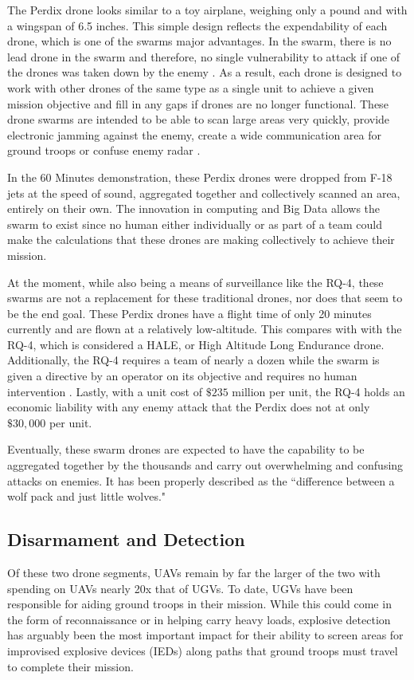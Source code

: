 \documentclass[sigconf]{acmart}
\begin{document}
The Perdix drone looks similar to a toy airplane, weighing only a pound and with a wingspan of 6.5 inches. This simple design reflects the expendability of each drone, which is one of the swarms major advantages. In the swarm, there is no lead drone in the swarm and therefore, no single vulnerability to attack if one of the drones was taken down by the enemy \cite{mitswarm}. As a result, each drone is designed to work with other drones of the same type as a single unit to achieve a given mission objective and fill in any gaps if drones are no longer functional. These drone swarms are intended to be able to scan large areas very quickly, provide electronic jamming against the enemy, create a wide communication area for ground troops or confuse enemy radar \cite{popularmechanics}.

In the 60 Minutes demonstration, these Perdix drones were dropped from F-18 jets at the speed of sound, aggregated together and collectively scanned an area, entirely on their own. The innovation in computing and Big Data allows the swarm to exist since no human either individually or as part of a  team could make the calculations that these drones are making collectively to achieve their mission.

 At the moment, while also being a means of surveillance like the RQ-4, these swarms are not a replacement for these traditional drones, nor does that seem to be the end goal. These Perdix drones have a flight time of only 20 minutes currently and are flown at a relatively low-altitude. This compares with with the RQ-4, which is considered a HALE, or High Altitude Long Endurance drone. Additionally, the RQ-4 requires a team of nearly a dozen while the swarm is given a directive by an operator on its objective and requires no human intervention \cite{ftswarm}. Lastly, with a unit cost of $\$235$ million per unit, the RQ-4 holds an economic liability with any enemy attack that the Perdix does not at only $\$30,000$ per unit. 

Eventually, these swarm drones are expected to have the capability to be aggregated together by the thousands and carry out overwhelming and confusing attacks on enemies. It has been properly described as the ``difference between a wolf pack and just little wolves\cite{ftswarm}."

\subsection{Disarmament and Detection}
Of these two drone segments, UAVs remain by far the larger of the two with spending on UAVs nearly 20x that of UGVs\cite{dronebudget}. To date, UGVs have been responsible for aiding ground troops in their mission. While this could come in the form of reconnaissance or in helping carry heavy loads, explosive detection has arguably been the most important impact for their ability to screen areas for improvised explosive devices (IEDs) along paths that ground troops must travel to complete their mission. 
\end{document}
